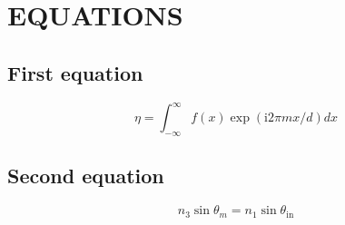 %
%
\appendix %
% 
\chapter{EQUATIONS}
%
\section{First equation}
%
\begin{equation}
\eta=\int_{-\infty}^\infty f(x)\exp\left(\textrm{i} 2\pi mx/d\right)d x
\end{equation}
%
\blindmathpaper
%
\section{Second equation}
%
\begin{equation}
n_3\sin\theta_m=n_1\sin\theta_\mathrm{in}
\end{equation}
%
\blindmathpaper








